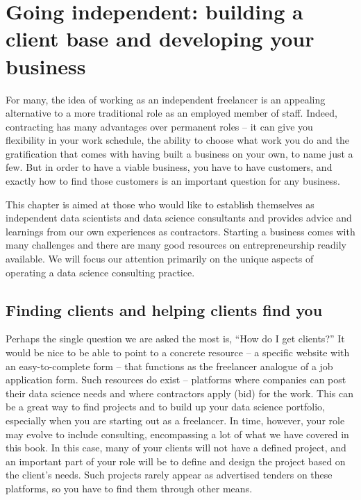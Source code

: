 \documentclass[
]{book}
\begin{document}
\hypertarget{going-independent-building-a-client-base-and-developing-your-business}{%
\chapter{Going independent: building a client base and developing your business}\label{going-independent-building-a-client-base-and-developing-your-business}}

For many, the idea of working as an independent freelancer is an appealing alternative to a more traditional role as an employed member of staff. Indeed, contracting has many advantages over permanent roles -- it can give you flexibility in your work schedule, the ability to choose what work you do and the gratification that comes with having built a business on your own, to name just a few. But in order to have a viable business, you have to have customers, and exactly how to find those customers is an important question for any business.

This chapter is aimed at those who would like to establish themselves as independent data scientists and data science consultants and provides advice and learnings from our own experiences as contractors. Starting a business comes with many challenges and there are many good resources on entrepreneurship readily available. We will focus our attention primarily on the unique aspects of operating a data science consulting practice.

\hypertarget{finding-clients-and-helping-clients-find-you}{%
\section{Finding clients and helping clients find you}\label{finding-clients-and-helping-clients-find-you}}

Perhaps the single question we are asked the most is, ``How do I get clients?'' It would be nice to be able to point to a concrete resource -- a specific website with an easy-to-complete form -- that functions as the freelancer analogue of a job application form. Such resources do exist -- platforms where companies can post their data science needs and where contractors apply (bid) for the work. This can be a great way to find projects and to build up your data science portfolio, especially when you are starting out as a freelancer. In time, however, your role may evolve to include consulting, encompassing a lot of what we have covered in this book. In this case, many of your clients will not have a defined project, and an important part of your role will be to define and design the project based on the client's needs. Such projects rarely appear as advertised tenders on these platforms, so you have to find them through other means.
\end{document}
